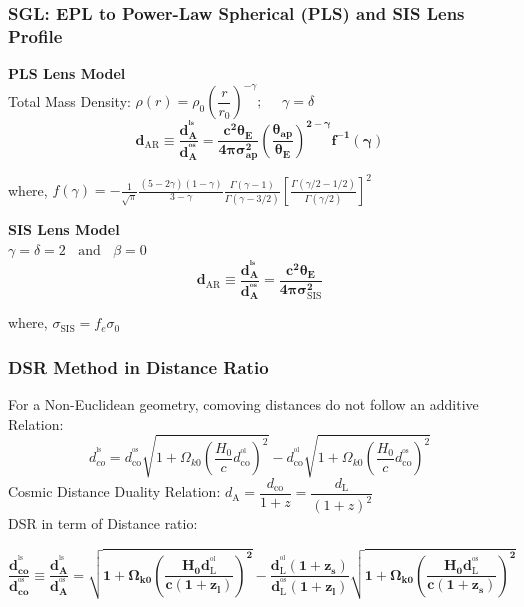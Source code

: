 \documentclass[xcolor=table,bigger]{beamer}
\begin{document}
\begin{frame}
 \frametitle{{SGL}: {\normalsize \textbf{EPL} to \textbf{ Power-Law Spherical (PLS) }and \textbf{SIS} Lens Profile}}
 \textbf{ PLS Lens Model}
\vspace{2mm}\\
Total Mass Density: $\rho(r)=\rho_{0}\left(\dfrac{r}{r_{0}}\right)^{-\gamma};~~~~~~ \gamma=\delta$
$$
{\boxed{\boldsymbol{d_{\mathrm{AR}}\equiv\dfrac{d_{A}^{^{l s}}}{d_{A}^{^{o s}}}=\dfrac{c^{2} \theta_{E}}{4 \pi \sigma_{ap}^{2}}\left(\dfrac{\theta_{a p}}{\theta_{E}}\right)^{2-\gamma} f^{-1}(\gamma)}}}
$$
\begin{flushright}
where, $f(\gamma)=-\frac{1}{\sqrt{\pi}} \frac{(5-2 \gamma)(1-\gamma)}{3-\gamma} \frac{\Gamma(\gamma-1)}{\Gamma(\gamma-3 / 2)}\left[\frac{\Gamma(\gamma / 2-1 / 2)}{\Gamma(\gamma / 2)}\right]^{2}$
\end{flushright}
 \textbf{ SIS Lens Model}
\vspace{2mm}\\
$\gamma=\delta=2~~~~\text{and}~~~~\beta=0$
$$
{\boxed{\boldsymbol{d_{\mathrm{AR}}\equiv\dfrac{d_A^{^{ls}}}{d_A^{^{os}}}=\dfrac{c^2\theta_E}{4\pi \sigma_{\mathrm{SIS}}^2}}}}
$$
\begin{flushright}
  where, $\sigma_{\mathrm{SIS}}=f_e\sigma_0$

 \end{flushright} \end{frame}
 \begin{frame}
 \frametitle{DSR Method in Distance Ratio}
 \vspace{3mm}
   For a Non-Euclidean geometry, comoving distances do not follow an additive Relation:
  $$
  d_{c o}^{^{\mathrm{ls}}}= d_\mathrm{c o}^{^\mathrm{os}} \sqrt{1+\Omega_{k0} \left(\dfrac{H_0}{c}d_\mathrm{c o}^\mathrm{^{ol}}\right)^{2}}-d_\mathrm{c o}^{^\mathrm{ol} }\sqrt{1+\Omega_{k0}\left(\dfrac{H_0}{c} d_\mathrm{c o}^{^\mathrm{os}}\right)^{2}}
  $$
    Cosmic Distance Duality Relation:  $d_\mathrm{A}=\dfrac{d_\mathrm{c o}}{1+z}=\dfrac{d_\mathrm{L}}{(1+z)^{2}}$
  \vspace{3mm}\\
 DSR in term of Distance ratio:
 \vspace{1mm}\\
\begin{footnotesize}
$$
{\boxed{\boldsymbol{\dfrac{d_{c o}^{^{\mathrm{ls}}}}{d_{c o}^{^{\mathrm{os}}}}\equiv\dfrac{d_{A}^{^{\mathrm{ls}}}}{d_{A}^{^{\mathrm{os}}}}= \sqrt{1+\Omega_{k0} \left(\dfrac{H_0d_\mathrm{L}^\mathrm{^{ol}}}{c(1+z_l)}\right)^{2}}-\dfrac{d_\mathrm{L}^{^\mathrm{ol} }(1+z_s)}{ d_\mathrm{L}^{^\mathrm{os}}(1+z_l)}\sqrt{1+\Omega_{k0}\left(\dfrac{H_0d_\mathrm{L}^{^\mathrm{os}}}{c(1+z_s)} \right)^{2}}}}}
 $$
\end{footnotesize}
 \end{frame}
\end{document}
